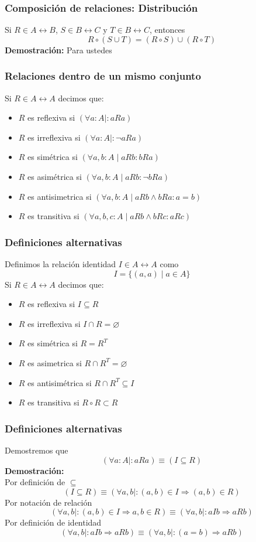 \documentclass{beamer}
\newcommand{\then}{\Rightarrow}
\begin{document}
\begin{frame}[fragile]
    \frametitle{Composición de relaciones: Distribución} 
    Si $R \in A \leftrightarrow B$, $S \in B \leftrightarrow C$ y $T \in B \leftrightarrow C$, entonces
    $$ R \circ (S \cup T) = (R \circ S) \cup (R \circ T)$$
    \textbf{Demostración:} Para ustedes
    \vspace{165pt}
\end{frame}

\begin{frame}[fragile]
    \frametitle{Relaciones dentro de un mismo conjunto}
    Si $R \in A \leftrightarrow A$ decimos que:
    \begin{itemize}
        \item $R$ es reflexiva si $(\forall a:A \mid : aRa)$
        \item $R$ es irreflexiva si $(\forall a:A \mid : \lnot aRa)$
        \item $R$ es simétrica si $(\forall a, b:A \mid aRb : bRa)$
        \item $R$ es asimétrica si $(\forall a, b:A \mid aRb : \lnot bRa)$
        \item $R$ es antisimetrica si $(\forall a, b:A \mid aRb \land bRa : a = b)$
        \item $R$ es transitiva si $(\forall a, b, c:A \mid aRb \land bRc: aRc)$
    \end{itemize}
\end{frame}

\begin{frame}[fragile]
    \frametitle{Definiciones alternativas}
    Definimos la relación identidad $I \in A \leftrightarrow A$ como
    $$I = \{(a, a) \mid a \in A\}$$
    Si $R \in A \leftrightarrow A$ decimos que:
    \begin{itemize}
        \item $R$ es reflexiva si $I \subseteq R$
        \item $R$ es irreflexiva si $I \cap R = \varnothing$
        \item $R$ es simétrica si $R = R^T$
        \item $R$ es asimetrica si $R \cap R^T = \varnothing$
        \item $R$ es antisimétrica si $R \cap R^T \subseteq I$
        \item $R$ es transitiva si $R \circ R \subset R$
    \end{itemize}
\end{frame}

\begin{frame}[fragile]
    \frametitle{Definiciones alternativas}
    Demostremos que
    $$(\forall a:A \mid : aRa) \equiv (I \subseteq R)$$
    \textbf{Demostración:} \\
    Por definición de $\subseteq$
    $$(I \subseteq R) \equiv (\forall a, b \mid : (a,b) \in I \then (a,b) \in R)$$
    Por notación de relación
    $$(\forall a, b \mid : (a,b) \in I \then a,b \in R) \equiv (\forall a, b \mid : aIb \then aRb)$$
    Por definición de identidad
    $$(\forall a, b \mid : aIb \then aRb) \equiv (\forall a, b \mid : (a=b) \then aRb )$$
\end{frame}
\end{document}
